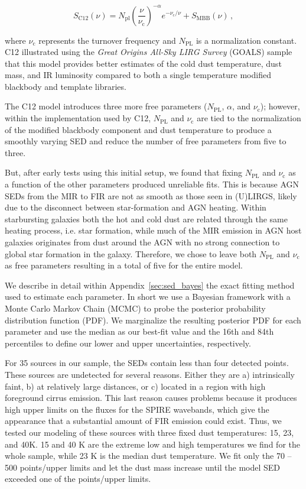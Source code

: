\documentclass[fleqn, usenatbib]{mnras}
\begin{document}
\begin{equation}\label{eq:casey}
S_{\mathrm{C12}}(\nu) = N_{\mathrm{pl}}\left(\frac{\nu}{\nu_{\mathrm{c}}}\right)^{-\alpha}e^{-\nu_{\mathrm{c}}/\nu} + S_{\mathrm{MBB}}(\nu)\,,
\end{equation}

\noindent where $\nu_{\mathrm{c}}$ represents the turnover frequency and $N_{\mathrm{PL}}$ is a normalization constant. C12 illustrated using the \textit{Great Origins All-Sky LIRG Survey} (GOALS) sample that this model provides better estimates of the cold dust temperature, dust mass, and IR luminosity compared to both a single temperature modified blackbody and template libraries.

The C12 model introduces three more free parameters ($N_{\mathrm{PL}}$, $\alpha$, and $\nu_{\mathrm{c}}$); however, within the implementation used by C12, $N_{\mathrm{PL}}$ and $\nu_{\mathrm{c}}$ are tied to the normalization of the modified blackbody component and dust temperature to produce a smoothly varying SED and reduce the number of free parameters from five to three. 

But, after early tests using this initial setup, we found that fixing $N_{\mathrm{PL}}$ and $\nu_{\mathrm{c}}$ as a function of the other parameters produced unreliable fits. This is because AGN SEDs from the MIR to FIR are not as smooth as those seen in (U)LIRGS, likely due to the disconnect between star-formation and AGN heating. Within starbursting galaxies both the hot and cold dust are related through the same heating process, i.e. star formation, while much of the MIR emission in AGN host galaxies originates from dust around the AGN with no strong connection to global star formation in the galaxy. Therefore, we chose to leave both $N_{\mathrm{PL}}$ and $\nu_{\mathrm{c}}$ as free parameters resulting in a total of five for the entire model.

We describe in detail within Appendix~\ref{sec:sed_bayes} the exact fitting method used to estimate each parameter. In short we use a Bayesian framework with a Monte Carlo Markov Chain (MCMC) to probe the posterior probability distribution function (PDF). We marginalize the resulting posterior PDF for each parameter and use the median as our best-fit value and the 16th and 84th percentiles to define our lower and upper uncertainties, respectively. 

For 35 sources in our sample, the SEDs contain less than four detected points. These sources are undetected for several reasons. Either they are a) intrinsically faint, b) at relatively large distances, or c) located in a region with high foreground cirrus emission. This last reason causes problems because it produces high upper limits on the fluxes for the SPIRE wavebands, which give the appearance that a substantial amount of FIR emission could exist. Thus, we tested our modeling of these sources with three fixed dust temperatures: 15, 23, and 40K. 15 and 40 K are the extreme low and high temperatures we find for the whole sample, while 23 K is the median dust temperature. We fit only the 70 -- 500 \micron{} points/upper limits and let the dust mass increase until the model SED exceeded one of the points/upper limits. 
\end{document}
